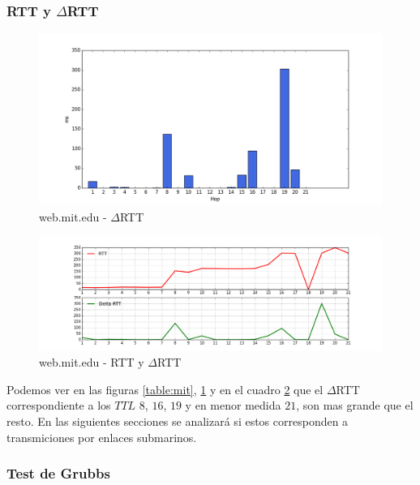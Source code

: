 \subsubsection{RTT y $\Delta$RTT}

\begin{figure}[H]
    \begin{center}
        \includegraphics[width=1\textwidth]{data/rtt-mit-bar.png}
        \caption{web.mit.edu - $\Delta$RTT}
        \label{histo:mit}
    \end{center}
\end{figure}

\begin{figure}[H]
    \begin{center}
        \includegraphics[width=1\textwidth]{data/rtt-mit-lines.png}
        \caption{web.mit.edu - RTT y $\Delta$RTT}
        \label{lines:mit}
    \end{center}
\end{figure}


Podemos ver en las figuras \ref{table:mit}, \ref{histo:mit} y en el cuadro \ref{lines:mit} que el $\Delta$RTT correspondiente a los $TTL$ $8$, $16$, $19$ y en menor medida $21$, son mas grande que el resto. En las siguientes secciones se analizará si estos corresponden a transmiciones por enlaces submarinos.


\subsubsection{Test de Grubbs}\label{mit:grubbs}

